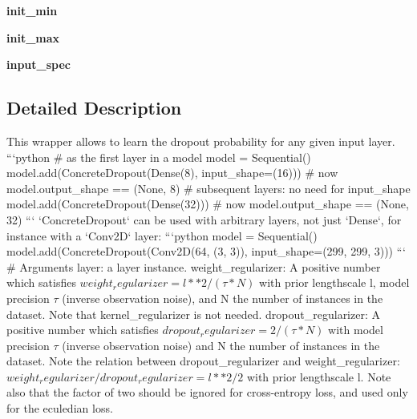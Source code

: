 \begin{DoxyCompactItemize}
\item 
\hypertarget{classaml__planners_1_1push__planner_1_1forward__models_1_1concrete__dropout_1_1_concrete_dropout_a12e2c0605718f57a7ddba41583d9ce00}{{\bfseries init\-\_\-min}}\label{classaml__planners_1_1push__planner_1_1forward__models_1_1concrete__dropout_1_1_concrete_dropout_a12e2c0605718f57a7ddba41583d9ce00}

\item 
\hypertarget{classaml__planners_1_1push__planner_1_1forward__models_1_1concrete__dropout_1_1_concrete_dropout_acc22988706bb9824f11239d8d47e2a0e}{{\bfseries init\-\_\-max}}\label{classaml__planners_1_1push__planner_1_1forward__models_1_1concrete__dropout_1_1_concrete_dropout_acc22988706bb9824f11239d8d47e2a0e}

\item 
\hypertarget{classaml__planners_1_1push__planner_1_1forward__models_1_1concrete__dropout_1_1_concrete_dropout_aeb117f476b2b6b6165723caa815a1cd1}{{\bfseries input\-\_\-spec}}\label{classaml__planners_1_1push__planner_1_1forward__models_1_1concrete__dropout_1_1_concrete_dropout_aeb117f476b2b6b6165723caa815a1cd1}

\end{DoxyCompactItemize}


\subsection{Detailed Description}
\begin{DoxyVerb}This wrapper allows to learn the dropout probability for any given input layer.
```python
    # as the first layer in a model
    model = Sequential()
    model.add(ConcreteDropout(Dense(8), input_shape=(16)))
    # now model.output_shape == (None, 8)
    # subsequent layers: no need for input_shape
    model.add(ConcreteDropout(Dense(32)))
    # now model.output_shape == (None, 32)
```
`ConcreteDropout` can be used with arbitrary layers, not just `Dense`,
for instance with a `Conv2D` layer:
```python
    model = Sequential()
    model.add(ConcreteDropout(Conv2D(64, (3, 3)),
                              input_shape=(299, 299, 3)))
```
# Arguments
    layer: a layer instance.
    weight_regularizer:
        A positive number which satisfies
            $weight_regularizer = l**2 / (\tau * N)$
        with prior lengthscale l, model precision $\tau$ (inverse observation noise),
        and N the number of instances in the dataset.
        Note that kernel_regularizer is not needed.
    dropout_regularizer:
        A positive number which satisfies
            $dropout_regularizer = 2 / (\tau * N)$
        with model precision $\tau$ (inverse observation noise) and N the number of
        instances in the dataset.
        Note the relation between dropout_regularizer and weight_regularizer:
            $weight_regularizer / dropout_regularizer = l**2 / 2$
        with prior lengthscale l. Note also that the factor of two should be
        ignored for cross-entropy loss, and used only for the eculedian loss.
\end{DoxyVerb}
 

